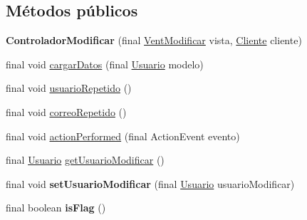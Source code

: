 \subsection*{Métodos públicos}
\begin{DoxyCompactItemize}
\item 
\hypertarget{classcom_1_1ucab_1_1javachat_1_1_cliente_1_1controller_1_1_controlador_modificar_a6123a8b8e53bbf04d1a68ff4722e2dd9}{{\bfseries Controlador\-Modificar} (final \hyperlink{classcom_1_1ucab_1_1javachat_1_1_cliente_1_1view_1_1_vent_modificar}{Vent\-Modificar} vista, \hyperlink{classcom_1_1ucab_1_1javachat_1_1_cliente_1_1model_1_1_cliente}{Cliente} cliente)}\label{classcom_1_1ucab_1_1javachat_1_1_cliente_1_1controller_1_1_controlador_modificar_a6123a8b8e53bbf04d1a68ff4722e2dd9}

\item 
final void \hyperlink{classcom_1_1ucab_1_1javachat_1_1_cliente_1_1controller_1_1_controlador_modificar_a70d237e77c3b71f36bbacf7273ecc928}{cargar\-Datos} (final \hyperlink{classcom_1_1ucab_1_1javachat_1_1_cliente_1_1model_1_1_usuario}{Usuario} modelo)
\item 
final void \hyperlink{classcom_1_1ucab_1_1javachat_1_1_cliente_1_1controller_1_1_controlador_modificar_a98998ef15a60c2652086c638f3d49626}{usuario\-Repetido} ()
\item 
final void \hyperlink{classcom_1_1ucab_1_1javachat_1_1_cliente_1_1controller_1_1_controlador_modificar_a15be7ce5dba7613ab67666421ad5df8b}{correo\-Repetido} ()
\item 
final void \hyperlink{classcom_1_1ucab_1_1javachat_1_1_cliente_1_1controller_1_1_controlador_modificar_adf78b1559924c21769b55b0c3f5d799f}{action\-Performed} (final Action\-Event evento)
\item 
final \hyperlink{classcom_1_1ucab_1_1javachat_1_1_cliente_1_1model_1_1_usuario}{Usuario} \hyperlink{classcom_1_1ucab_1_1javachat_1_1_cliente_1_1controller_1_1_controlador_modificar_a50fed3d5d044639f7a4d8fc076876d88}{get\-Usuario\-Modificar} ()
\item 
\hypertarget{classcom_1_1ucab_1_1javachat_1_1_cliente_1_1controller_1_1_controlador_modificar_a567c65f9fbdc43f40e4ab0dd7c047ba9}{final void {\bfseries set\-Usuario\-Modificar} (final \hyperlink{classcom_1_1ucab_1_1javachat_1_1_cliente_1_1model_1_1_usuario}{Usuario} usuario\-Modificar)}\label{classcom_1_1ucab_1_1javachat_1_1_cliente_1_1controller_1_1_controlador_modificar_a567c65f9fbdc43f40e4ab0dd7c047ba9}

\item 
\hypertarget{classcom_1_1ucab_1_1javachat_1_1_cliente_1_1controller_1_1_controlador_modificar_a8a658d9065bd5f1e88a2a99f23d50784}{final boolean {\bfseries is\-Flag} ()}\label{classcom_1_1ucab_1_1javachat_1_1_cliente_1_1controller_1_1_controlador_modificar_a8a658d9065bd5f1e88a2a99f23d50784}


\end{DoxyCompactItemize}
